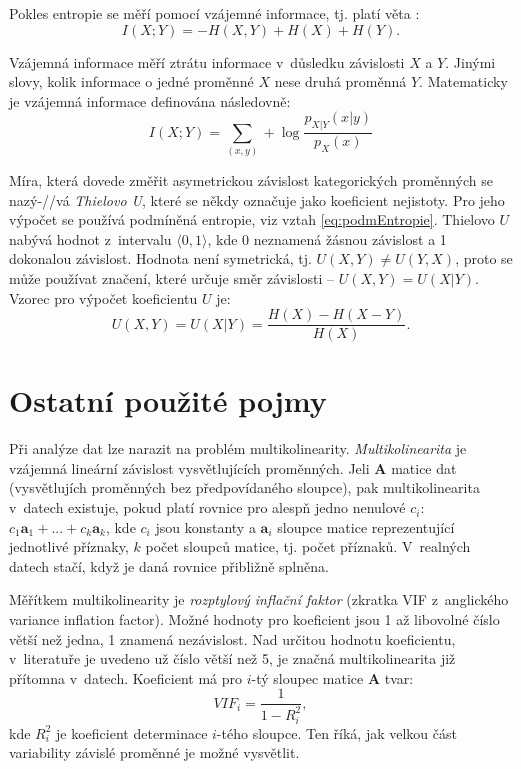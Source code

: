 Pokles entropie se měří pomocí vzájemné informace, tj. platí věta \cite{bib:MI3}:
\begin{equation}
    I(X;Y) = -H(X,Y)+H(X)+H(Y).
 \end{equation}

Vzájemná informace měří ztrátu informace v~důsledku závislosti $X$ a $Y$. Jinými slovy, kolik informace o jedné proměnné $X$ nese druhá proměnná $Y$. Matematicky je vzájemná informace definována následovně: \cite{bib:MI, bib:MI3, bib:literatura}
\begin{equation}
    I(X;Y) = \sum_{(x,y)} + \log \frac{p_{X\vert Y}(x\vert y)}{p_X(x)}
\end{equation}

Míra, která dovede změřit asymetrickou závislost kategorických proměnných se nazý-//vá \emph{Thielovo U}, které se někdy označuje jako koeficient nejistoty. Pro jeho výpočet se používá podmíněná entropie, viz vztah \ref{eq:podmEntropie}. Thielovo $U$  nabývá hodnot z~intervalu $\langle 0, 1 \rangle$, kde 0 neznamená žásnou závislost a 1 dokonalou závislost. Hodnota není symetrická, tj. $U(X,Y)\neq U(Y,X)$, proto se může používat značení, které určuje směr závislosti -- $U(X,Y) = U(X|Y)$. Vzorec pro výpočet koeficientu $U$ je: \cite{bib:thiel,bib:correl}
\begin{equation}
    U(X,Y) = U(X|Y) = \frac{H(X)-H(X-Y)}{H(X)}.
\end{equation}

\section*{Ostatní použité pojmy}

Při analýze dat lze narazit na problém multikolinearity. \emph{Multikolinearita} je vzájemná lineární závislost vysvětlujících proměnných. Jeli $\mathbf{A}$ matice dat (vysvětlujích proměnných bez předpovídaného sloupce), pak multikolinearita v~datech existuje, pokud platí rovnice pro alespň jedno nenulové $c_i$: $c_1\bm{a}_1 + ... + c_k\bm{a}_k$, kde $c_i$ jsou konstanty a $\bm{a}_i$ sloupce matice reprezentující jednotlivé příznaky, $k$ počet sloupců matice, tj. počet příznaků. V~realných datech stačí, když je daná rovnice přibližně splněna.\cite{bib:MB}

Měřítkem multikolinearity je \emph{rozptylový inflační faktor} (zkratka VIF z~anglického variance inflation factor). Možné hodnoty pro koeficient jsou 1 až libovolné číslo větší než jedna, 1 znamená nezávislost. Nad určitou hodnotu koeficientu, v~literatuře \cite{bib:multi} je uvedeno už číslo větší než 5, je značná multikolinearita již přítomna v~datech. Koeficient má pro $i$-tý sloupec matice $\mathbf{A}$ tvar:
\begin{equation}
    VIF_i = \frac{1}{1-R_i^2},
\end{equation}
kde $R_i^2$ je koeficient determinace $i$-tého sloupce. Ten říká, jak velkou část variability závislé proměnné je možné vysvětlit.\cite{bib:multi}

